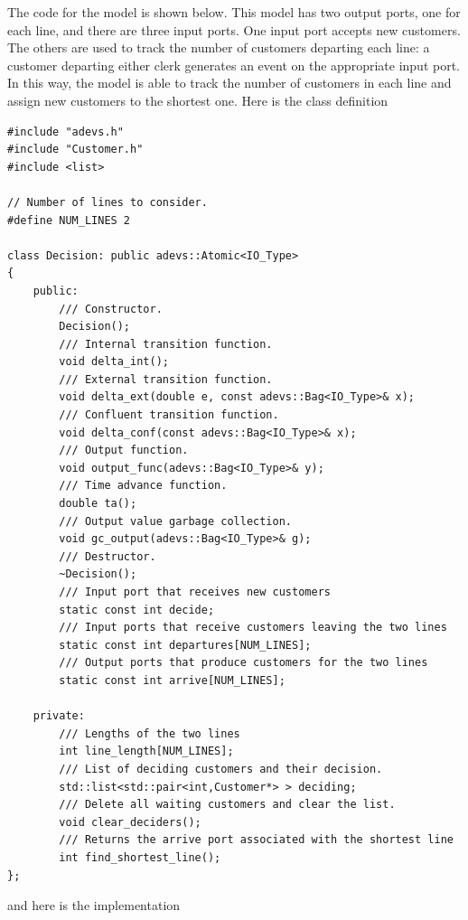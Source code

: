 The code for the  model is shown below. This model has two output ports, one for each line, and there are three input ports. One input port accepts new customers. The others are used to track the number of customers departing each line: a customer departing either clerk generates an event on the appropriate input port. In this way, the model is able to track the number of customers in each line and assign new customers to the shortest one. Here is the class definition
\begin{verbatim}
#include "adevs.h"
#include "Customer.h"
#include <list>

// Number of lines to consider.
#define NUM_LINES 2

class Decision: public adevs::Atomic<IO_Type>
{
    public:
        /// Constructor.
        Decision();
        /// Internal transition function.
        void delta_int();
        /// External transition function.
        void delta_ext(double e, const adevs::Bag<IO_Type>& x);
        /// Confluent transition function.
        void delta_conf(const adevs::Bag<IO_Type>& x);
        /// Output function.  
        void output_func(adevs::Bag<IO_Type>& y);
        /// Time advance function.
        double ta();
        /// Output value garbage collection.
        void gc_output(adevs::Bag<IO_Type>& g);
        /// Destructor.
        ~Decision();
        /// Input port that receives new customers
        static const int decide;
        /// Input ports that receive customers leaving the two lines
        static const int departures[NUM_LINES];
        /// Output ports that produce customers for the two lines
        static const int arrive[NUM_LINES];

    private:
        /// Lengths of the two lines
        int line_length[NUM_LINES];
        /// List of deciding customers and their decision.
        std::list<std::pair<int,Customer*> > deciding;
        /// Delete all waiting customers and clear the list.
        void clear_deciders();
        /// Returns the arrive port associated with the shortest line
        int find_shortest_line();
};
\end{verbatim}
and here is the implementation
